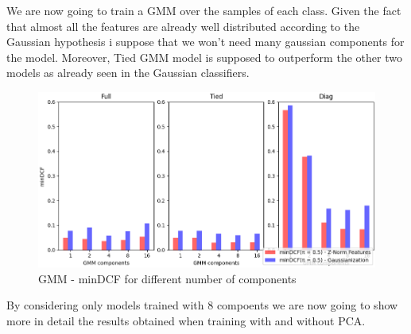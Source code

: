 \documentclass[10pt, a4paper, twocolumn]{article} %
\begin{document}
We are now going to train a GMM
over the samples of each class. Given the fact that almost all the features are already well
distributed according to the Gaussian hypothesis i suppose that we won't need many gaussian 
components for the model. Moreover, Tied GMM model is supposed to outperform the other two
models as already seen in the Gaussian classifiers.
\begin{figure}[ht!]
	\includegraphics[width=\linewidth]{./Pictures/FeaturesAnalysis/gmmhist.png}
	\caption{GMM - minDCF for different number of components}
	\label{gmmhist} 
\end{figure}
By considering only models trained with 8 compoents we are now going to show 
more in detail the results obtained when training with and without PCA.
\end{document}
